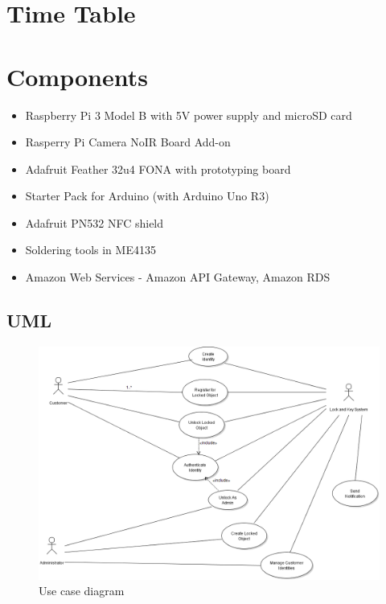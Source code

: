 \documentclass{article}
\begin{document}

\lipsum[1]

\section{Time Table}


\lipsum[1]

\section{Components}

\begin{itemize}
	\item Raspberry Pi 3 Model B with 5V power supply and microSD card
	\item Rasperry Pi Camera NoIR Board Add-on
	\item Adafruit Feather 32u4 FONA with prototyping board
	\item Starter Pack for Arduino (with Arduino Uno R3)
	\item Adafruit PN532 NFC shield
	\item Soldering tools in ME4135
	\item Amazon Web Services - Amazon API Gateway, Amazon RDS
\end{itemize}

\pagebreak

\begin{appendices}

\section{UML}

\begin{figure}[!ht]
	\includegraphics[width=\textwidth]{UML/lock_and_key}
	\caption{Use case diagram}
	\label{fig:use_case}
\end{figure}

\end{appendices}

\pagebreak

\printbibliography
\end{document}
